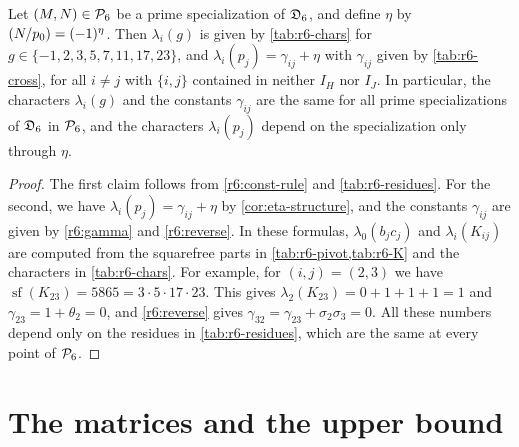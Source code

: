 \begin{lemma}\label{lem:r6-characters}
Let $(M,N)\in\mathcal P_6$ be a prime specialization of $\mathfrak D_6$, and define $\eta$ by $\leg{N}{p_0}=(-1)^\eta$. Then $\lambda_i(g)$ is given by \cref{tab:r6-chars} for $g\in\{-1,2,3,5,7,11,17,23\}$, and $\lambda_i(p_j)=\gamma_{ij}+\eta$ with $\gamma_{ij}$ given by \cref{tab:r6-cross}, for all $i\ne j$ with $\{i,j\}$ contained in neither $I_H$ nor $I_J$. In particular, the characters $\lambda_i(g)$ and the constants $\gamma_{ij}$ are the same for all prime specializations of $\mathfrak D_6$ in $\mathcal P_6$, and the characters $\lambda_i(p_j)$ depend on the specialization only through $\eta$.
\end{lemma}

\begin{proof}
The first claim follows from \eqref{r6:const-rule} and \cref{tab:r6-residues}. For the second, we have $\lambda_i(p_j)=\gamma_{ij}+\eta$ by \cref{cor:eta-structure}, and the constants $\gamma_{ij}$ are given by \eqref{r6:gamma} and \eqref{r6:reverse}. In these formulas, $\lambda_0(b_jc_j)$ and $\lambda_i(K_{ij})$ are computed from the squarefree parts in \cref{tab:r6-pivot,tab:r6-K} and the characters in \cref{tab:r6-chars}. For example, for $(i,j)=(2,3)$ we have $\operatorname{sf}(K_{23})=5865=3\cdot5\cdot17\cdot23$. This gives $\lambda_2(K_{23})=0+1+1+1=1$ and $\gamma_{23}=1+\theta_2=0$, and \eqref{r6:reverse} gives $\gamma_{32}=\gamma_{23}+\sigma_2\sigma_3=0$. All these numbers depend only on the residues in \cref{tab:r6-residues}, which are the same at every point of $\mathcal P_6$.
\end{proof}

\section{The matrices and the upper bound}\label{sec:r6-matrices}

